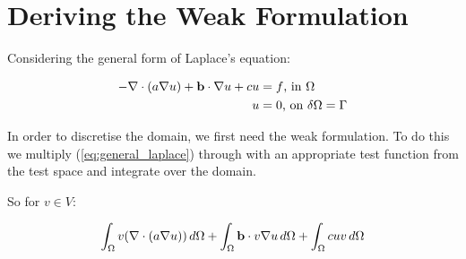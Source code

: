 \section{Deriving the Weak Formulation}

Considering the general form of Laplace's equation:

\begin{align}\label{eq:general_laplace}
    -\nabla\cdot(a\nabla{u}) + \mathbf{b}\cdot\nabla{u} + cu &= f \text{, in } \Omega \\
    u &= 0 \text{, on } \delta\Omega = \Gamma
\end{align}

In order to discretise the domain, we first need the weak formulation. To do
this we multiply (\ref{eq:general_laplace}) through with an appropriate test
function from the test space and integrate over the domain.

So for $v \in V$:

\[
    \int_{\Omega}{v(\nabla\cdot(a\nabla{u}))}\,d\Omega +
    \int_{\Omega}\mathbf{b}\cdot v\nabla{u}\,d\Omega +
    \int_{\Omega}cuv\,d\Omega
\]
